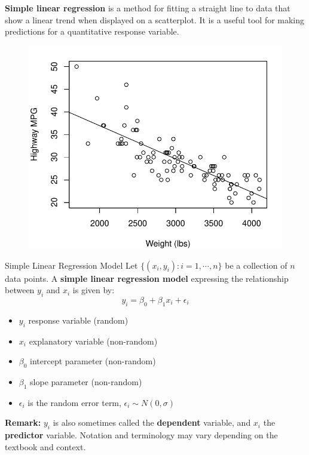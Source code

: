 \documentclass[10pt]{beamer}
\begin{document}
\begin{frame}
\textbf{Simple linear regression} is a method for fitting a straight line to data that show a linear trend when displayed on a scatterplot.  It is a useful tool for making predictions for a quantitative response variable. \begin{figure}
\includegraphics[scale=0.5]{figure/mpg_scatter_fit.pdf}
\end{figure}  
\end{frame}

\begin{frame}{Simple Linear Regression Model}
Let $\{ (x_i, y_i) : i=1, \cdots, n \}$ be a collection of $n$ data points.  A \textbf{simple linear regression model} expressing the relationship between $y_i$ and $x_i$ is given by:
$$ y_i = \beta_0 + \beta_1 x_i + \epsilon_i $$
\begin{itemize}
\item $y_i$ response variable (random)
\item $x_i$ explanatory variable (non-random)
\item $\beta_0$ intercept parameter (non-random)
\item $\beta_1$ slope parameter (non-random)
\item $\epsilon_i$ is the random error term, $\epsilon_i \sim N(0, \sigma)$\\ 
\end{itemize}
\vspace{15pt}

\footnotesize
\textbf{Remark:} $y_i$ is also sometimes called the \textbf{dependent} variable, and $x_i$ the \textbf{predictor} variable.  Notation and terminology may vary depending on the textbook and context.
\end{frame}
\end{document}
